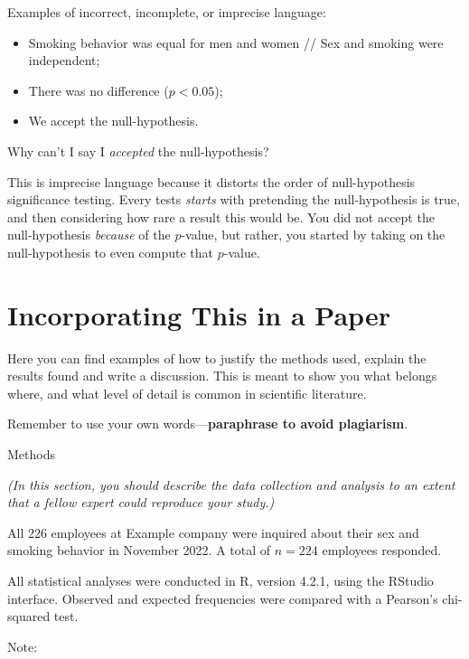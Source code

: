 \documentclass[
]{book}
\providecommand{\tightlist}{%
  \setlength{\itemsep}{0pt}\setlength{\parskip}{0pt}}
\begin{document}
Examples of incorrect, incomplete, or imprecise language:

\begin{itemize}
\tightlist
\item
  Smoking behavior was equal for men and women // Sex and smoking were independent;
\item
  There was no difference (\(p < 0.05\));
\item
  We accept the null-hypothesis.
\end{itemize}

Why can't I say I \emph{accepted} the null-hypothesis?

This is imprecise language because it distorts the order of null-hypothesis significance testing. Every tests \emph{starts} with pretending the null-hypothesis is true, and then considering how rare a result this would be. You did not accept the null-hypothesis \emph{because} of the \(p\)-value, but rather, you started by taking on the null-hypothesis to even compute that \(p\)-value.

\hypertarget{incorporating-this-in-a-paper-1}{%
\section{Incorporating This in a Paper}\label{incorporating-this-in-a-paper-1}}

Here you can find examples of how to justify the methods used, explain the results found and write a discussion. This is meant to show you what belongs where, and what level of detail is common in scientific literature.

Remember to use your own words---\textbf{paraphrase to avoid plagiarism}.

Methods

\emph{(In this section, you should describe the data collection and analysis to an extent that a fellow expert could reproduce your study.)}

All 226 employees at Example company were inquired about their sex and smoking behavior in November 2022. A total of \(n = 224\) employees responded.

All statistical analyses were conducted in R, version 4.2.1, using the RStudio interface.\citep{R, RStudio} Observed and expected frequencies were compared with a Pearson's chi-squared test.

Note:
\end{document}
